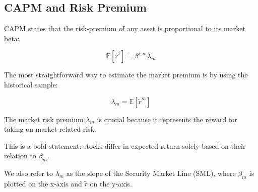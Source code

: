 \documentclass{article}
\begin{document}
\subsection{CAPM and Risk Premium}

CAPM states that the risk-premium of any asset is proportional to its market beta:

$$
\mathbb{E}[\tilde{r}^i] = \beta^{i, m} \lambda_m
$$

The most straightforward way to estimate the market premium is by using the historical sample:

$$
\lambda_m = \mathbb{E}[\tilde{r}^m]
$$

The market risk premium $\lambda_m$ is crucial because it represents the reward for taking on market-related risk.

This is a bold statement: stocks differ in expected return solely based on their relation to $\beta_m$.

We also refer to $\lambda_m$ as the slope of the Security Market Line (SML), where $\beta_m$ is plotted on the x-axis and $\tilde{r}$ on the y-axis.
\end{document}
